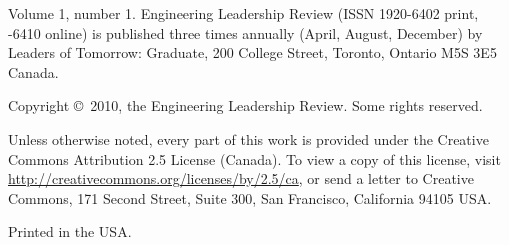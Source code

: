 \begin{colophon}
Volume 1, number 1.
Engineering Leadership Review (ISSN 1920-6402 print, -6410 online) is published three times annually (April, August, December) by Leaders of Tomorrow: Graduate, 200 College Street, Toronto, Ontario M5S 3E5 Canada.

Copyright \copyright~2010, the Engineering Leadership Review. Some rights reserved. \ccby{\baselineskip}

Unless otherwise noted, every part of this work is provided under the Creative Commons Attribution 2.5 License (Canada). To view a copy of this license, visit \url{http://creativecommons.org/licenses/by/2.5/ca}, or send a letter to Creative Commons, 171 Second Street, Suite 300, San Francisco, California 94105 USA.

Printed in the USA.
\end{colophon}
